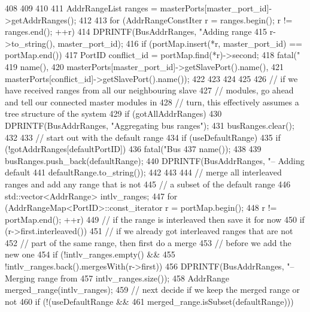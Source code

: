 \begin{DoxyCode}
{{{{408             }
409         }
410 
411         AddrRangeList ranges = masterPorts[master_port_id]->getAddrRanges();
412 
413         for (AddrRangeConstIter r = ranges.begin(); r != ranges.end(); ++r) {
414             DPRINTF(BusAddrRanges, "Adding range %
415                     r->to_string(), master_port_id);
416             if (portMap.insert(*r, master_port_id) == portMap.end()) {
417                 PortID conflict_id = portMap.find(*r)->second;
418                 fatal("%
419                       name(),
420                       masterPorts[master_port_id]->getSlavePort().name(),
421                       masterPorts[conflict_id]->getSlavePort().name());
422             }
423         }
424     }
425 
426     // if we have received ranges from all our neighbouring slave
427     // modules, go ahead and tell our connected master modules in
428     // turn, this effectively assumes a tree structure of the system
429     if (gotAllAddrRanges) {
430         DPRINTF(BusAddrRanges, "Aggregating bus ranges\n");
431         busRanges.clear();
432 
433         // start out with the default range
434         if (useDefaultRange) {
435             if (!gotAddrRanges[defaultPortID])
436                 fatal("Bus %
437                       name());
438 
439             busRanges.push_back(defaultRange);
440             DPRINTF(BusAddrRanges, "-- Adding default %
441                     defaultRange.to_string());
442         }
443 
444         // merge all interleaved ranges and add any range that is not
445         // a subset of the default range
446         std::vector<AddrRange> intlv_ranges;
447         for (AddrRangeMap<PortID>::const_iterator r = portMap.begin();
448              r != portMap.end(); ++r) {
449             // if the range is interleaved then save it for now
450             if (r->first.interleaved()) {
451                 // if we already got interleaved ranges that are not
452                 // part of the same range, then first do a merge
453                 // before we add the new one
454                 if (!intlv_ranges.empty() &&
455                     !intlv_ranges.back().mergesWith(r->first)) {
456                     DPRINTF(BusAddrRanges, "-- Merging range from %
457                             intlv_ranges.size());
458                     AddrRange merged_range(intlv_ranges);
459                     // next decide if we keep the merged range or not
460                     if (!(useDefaultRange &&
461                           merged_range.isSubset(defaultRange))) {
}}}}}}
\end{DoxyCode}
